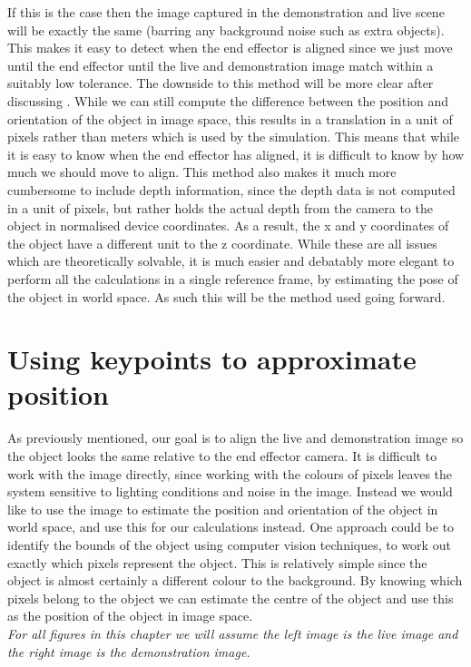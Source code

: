 If this is the case then the image captured in the demonstration and live scene will be exactly the same (barring any background noise such as extra objects). This makes it easy to detect when the end effector is aligned since we just move until the end effector until the live and demonstration image match within a suitably low tolerance. The downside to this method will be more clear after discussing . While we can still compute the difference between the position and orientation of the object in image space, this results in a translation in a unit of pixels rather than meters which is used by the simulation. This means that while it is easy to know when the end effector has aligned, it is difficult to know by how much we should move to align. This method also makes it much more cumbersome to include depth information, since the depth data is not computed in a unit of pixels, but rather holds the actual depth from the camera to the object in normalised device coordinates. As a result, the x and y coordinates of the object have a different unit to the z coordinate. While these are all issues which are theoretically solvable, it is much easier and debatably more elegant to perform all the calculations in a single reference frame, by estimating the pose of the object in world space. As such this will be the method used going forward.


\section{Using keypoints to approximate position}
\label{sec:keypoints}
As previously mentioned, our goal is to align the live and demonstration image so the object looks the same relative to the end effector camera. It is difficult to work with the image directly, since working with the colours of pixels leaves the system sensitive to lighting conditions and noise in the image. Instead we would like to use the image to estimate the position and orientation of the object in world space, and use this for our calculations instead. One approach could be to identify the bounds of the object using computer vision techniques, to work out exactly which pixels represent the object. This is relatively simple since the object is almost certainly a different colour to the background. By knowing which pixels belong to the object we can estimate the centre of the object and use this as the position of the object in image space.\\

\textit{For all figures in this chapter we will assume the left image is the live image and the right image is the demonstration image.}\\

